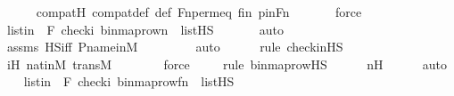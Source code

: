 \begin{isabellebody}
\ \ \ \ \isamarkupfalse%
\ compatH\ compat{\isacharunderscore}{\kern0pt}def\ {\isasympi}{\isacharunderscore}{\kern0pt}def\ Fn{\isacharunderscore}{\kern0pt}perm{\isacharprime}{\kern0pt}{\isacharunderscore}{\kern0pt}eq\ fin\ pinFn\ \isanewline
\ \ \ \ \isamarkupfalse%
\ force\isanewline
\isanewline
\ \ \isamarkupfalse%
\ listin{\isacharprime}{\kern0pt}{\isacharprime}{\kern0pt}\ {\isacharcolon}{\kern0pt}\ {\isachardoublequoteopen}{\isacharbrackleft}{\kern0pt}F{\isacharprime}{\kern0pt}{\isacharcomma}{\kern0pt}\ check{\isacharparenleft}{\kern0pt}i{\isacharparenright}{\kern0pt}{\isacharcomma}{\kern0pt}\ binmap{\isacharunderscore}{\kern0pt}row{\isacharprime}{\kern0pt}{\isacharparenleft}{\kern0pt}n{\isacharparenright}{\kern0pt}{\isacharbrackright}{\kern0pt}\ {\isasymin}\ list{\isacharparenleft}{\kern0pt}HS{\isacharparenright}{\kern0pt}{\isachardoublequoteclose}\ \isanewline
\ \ \ \ \isamarkupfalse%
\ auto{\isacharbrackleft}{\kern0pt}{}{\isacharbrackright}{\kern0pt}\isanewline
\ \ \ \ \isamarkupfalse%
\ assms\ HS{\isacharunderscore}{\kern0pt}iff\ P{\isacharunderscore}{\kern0pt}name{\isacharunderscore}{\kern0pt}in{\isacharunderscore}{\kern0pt}M\ \isanewline
\ \ \ \ \ \ \isamarkupfalse%
\ auto{\isacharbrackleft}{\kern0pt}{}{\isacharbrackright}{\kern0pt}\isanewline
\ \ \ \ \ \isamarkupfalse%
{\isacharparenleft}{\kern0pt}rule\ check{\isacharunderscore}{\kern0pt}in{\isacharunderscore}{\kern0pt}HS{\isacharparenright}{\kern0pt}\isanewline
\ \ \ \ \isamarkupfalse%
\ iH\ nat{\isacharunderscore}{\kern0pt}in{\isacharunderscore}{\kern0pt}M\ transM\ \isanewline
\ \ \ \ \ \isamarkupfalse%
\ force\isanewline
\ \ \ \ \isamarkupfalse%
{\isacharparenleft}{\kern0pt}rule\ binmap{\isacharunderscore}{\kern0pt}row{\isacharprime}{\kern0pt}{\isacharunderscore}{\kern0pt}HS{\isacharparenright}{\kern0pt}\isanewline
\ \ \ \ \isamarkupfalse%
\ nH\isanewline
\ \ \ \ \isamarkupfalse%
\ auto\isanewline
\isanewline
\ \ \isamarkupfalse%
\ listin{\isacharprime}{\kern0pt}{\isacharprime}{\kern0pt}{\isacharprime}{\kern0pt}\ {\isacharcolon}{\kern0pt}\ {\isachardoublequoteopen}{\isacharbrackleft}{\kern0pt}F{\isacharprime}{\kern0pt}{\isacharcomma}{\kern0pt}\ check{\isacharparenleft}{\kern0pt}i{\isacharparenright}{\kern0pt}{\isacharcomma}{\kern0pt}\ binmap{\isacharunderscore}{\kern0pt}row{\isacharprime}{\kern0pt}{\isacharparenleft}{\kern0pt}f{\isacharbackquote}{\kern0pt}n{\isacharparenright}{\kern0pt}{\isacharbrackright}{\kern0pt}\ {\isasymin}\ list{\isacharparenleft}{\kern0pt}HS{\isacharparenright}{\kern0pt}{\isachardoublequoteclose}\ \isanewline

\end{isabellebody}
